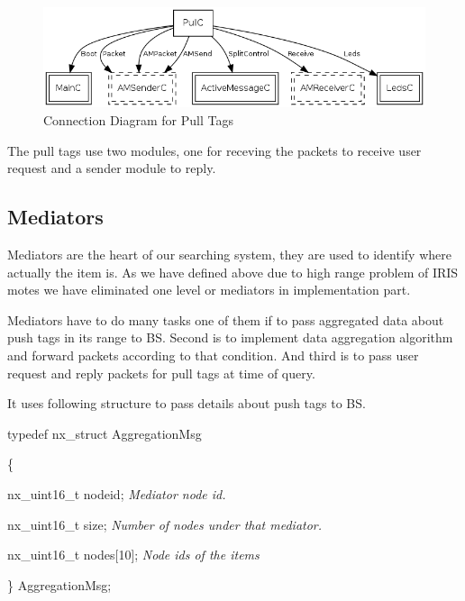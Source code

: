 \documentclass [a4paper,12pt]{book}
\begin{document}
\vspace{0.5cm}
\begin{figure}[!h]
\begin{center}
\includegraphics[scale=0.7]{images/21.png}
\caption{Connection Diagram for Pull Tags}
\label{pull_dia}
\end{center}
\end{figure}

The pull tags use two modules, one for receving the packets to receive user request and a sender module to reply.

\subsection{Mediators}

Mediators are the heart of our searching system, they are used to identify where actually the item is. As we have defined above due to high range problem of IRIS motes we have eliminated one level or mediators in implementation part.

Mediators have to do many tasks one of them if to pass aggregated data about push tags in its range to BS. Second is to implement data aggregation algorithm and forward packets according to that condition. And third is to pass user request and reply packets for pull tags at time of query.

It uses following structure to pass details about push tags to BS.

\begin{framed}
typedef nx\_struct AggregationMsg

\{

  \hspace{2em}nx\_uint16\_t nodeid;\hspace*{3em}	\emph{Mediator node id.}

  \hspace{2em}nx\_uint16\_t size;\hspace*{4em}	\emph{Number of nodes under that mediator.}

  \hspace{2em}nx\_uint16\_t nodes[10];\hspace*{2em}	\emph{Node ids of the items}

\} AggregationMsg;
\end{framed}
\end{document}

